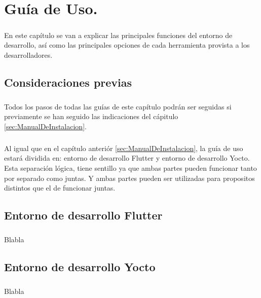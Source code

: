 \chapter{Guía de Uso.}\label{sec:GuiaDeUso}

\paragraph{}En este capítulo se van a explicar las principales funciones del entorno de
desarrollo, así como las principales opciones de cada herramienta provista a los
desarrolladores.

\section{Consideraciones previas}

\paragraph{}Todos los pasos de todas las guías de este capítulo podrán ser seguidas si
previamente se han seguido las indicaciones del cápitulo \ref{sec:ManualDeInstalacion}.

\paragraph{}Al igual que en el capítulo anteriór \ref{sec:ManualDeInstalacion}, la guía
de uso estará dividida en: entorno de desarrollo Flutter y entorno de desarrollo Yocto.
Esta separación lógica, tiene sentillo ya que ambas partes pueden funcionar tanto por
separado como juntas. Y ambas partes pueden ser utilizadas para propositos distintos
que el de funcionar juntas.

\section{Entorno de desarrollo Flutter}

\paragraph{}Blabla


\section{Entorno de desarrollo Yocto}

\paragraph{}Blabla


